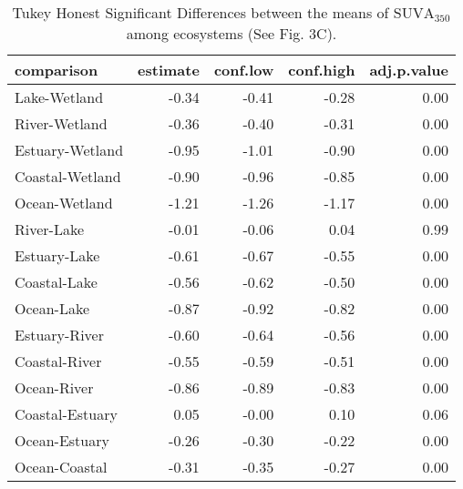 \begin{table}[ht]
\centering
\begin{tabular}{lrrrr}
  \hline
comparison & estimate & conf.low & conf.high & adj.p.value \\ 
  \hline
Lake-Wetland & -0.34 & -0.41 & -0.28 & 0.00 \\ 
  River-Wetland & -0.36 & -0.40 & -0.31 & 0.00 \\ 
  Estuary-Wetland & -0.95 & -1.01 & -0.90 & 0.00 \\ 
  Coastal-Wetland & -0.90 & -0.96 & -0.85 & 0.00 \\ 
  Ocean-Wetland & -1.21 & -1.26 & -1.17 & 0.00 \\ 
  River-Lake & -0.01 & -0.06 & 0.04 & 0.99 \\ 
  Estuary-Lake & -0.61 & -0.67 & -0.55 & 0.00 \\ 
  Coastal-Lake & -0.56 & -0.62 & -0.50 & 0.00 \\ 
  Ocean-Lake & -0.87 & -0.92 & -0.82 & 0.00 \\ 
  Estuary-River & -0.60 & -0.64 & -0.56 & 0.00 \\ 
  Coastal-River & -0.55 & -0.59 & -0.51 & 0.00 \\ 
  Ocean-River & -0.86 & -0.89 & -0.83 & 0.00 \\ 
  Coastal-Estuary & 0.05 & -0.00 & 0.10 & 0.06 \\ 
  Ocean-Estuary & -0.26 & -0.30 & -0.22 & 0.00 \\ 
  Ocean-Coastal & -0.31 & -0.35 & -0.27 & 0.00 \\ 
   \hline
\end{tabular}
\caption{Tukey Honest Significant Differences between the means of $\text{SUVA}_{350}$ among ecosystems (See Fig. 3C).} 
\end{table}
